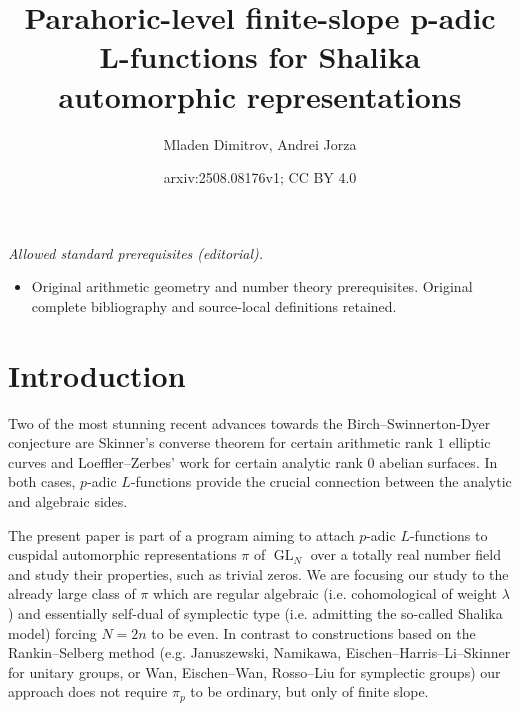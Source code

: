 \documentclass{amsart}
\title{Parahoric-level finite-slope p-adic L-functions for Shalika automorphic representations}
\author{Mladen Dimitrov, Andrei Jorza}
\date{arxiv:2508.08176v1; CC BY 4.0}
\theoremstyle{definition}
\newcommand{\GL}{\operatorname{GL}}
\begin{document}
\maketitle
\noindent\textit{Allowed standard prerequisites (editorial).}\begin{itemize}
\item Original arithmetic geometry and number theory prerequisites. Original complete bibliography and source-local definitions retained.
\end{itemize}\medskip
\section*{Introduction}

Two of the most stunning recent advances towards the Birch--Swinnerton-Dyer conjecture are  Skinner's  converse theorem  \cite{skinner:bsd}  
for certain arithmetic rank $1$ elliptic curves and Loeffler--Zerbes' work \cite{loeffler-zerbes:bsd} for certain analytic rank $0$
 abelian surfaces. In both cases, $p$-adic $L$-functions provide the crucial connection between the analytic and algebraic sides.


The present paper is part of a program aiming  to attach $p$-adic $L$-functions to cuspidal automorphic representations $\pi$ of $\GL_N$ over a totally real number field and study their properties, such as trivial zeros. We are focusing our study to the already large class of $\pi$ which are regular algebraic (i.e. cohomological of weight $\lambda$) and essentially self-dual of symplectic type (i.e. admitting the so-called Shalika model) forcing $N=2n$ to be even.  In contrast to constructions based on the Rankin--Selberg method (e.g. Januszewski, Namikawa,  Eischen--Harris--Li--Skinner for unitary groups,  or Wan, Eischen--Wan, Rosso--Liu for symplectic groups) our approach  does not  require $\pi_p$ to be ordinary, but only  of finite slope. 
\end{document}
